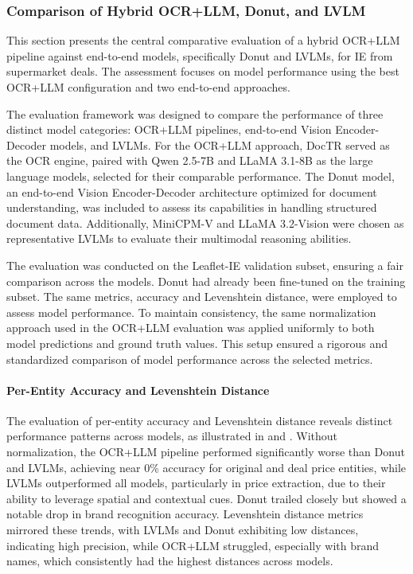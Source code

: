 \documentclass[11pt]{article}
\begin{document}
\subsubsection{Comparison of Hybrid OCR+LLM, Donut, and LVLM}

This section presents the central comparative evaluation of a hybrid OCR+LLM pipeline against end-to-end models, specifically Donut and LVLMs, for IE from supermarket deals. The assessment focuses on model performance using the best OCR+LLM configuration and two end-to-end approaches.

The evaluation framework was designed to compare the performance of three distinct model categories: OCR+LLM pipelines, end-to-end Vision Encoder-Decoder models, and LVLMs. For the OCR+LLM approach, DocTR served as the OCR engine, paired with Qwen 2.5-7B and LLaMA 3.1-8B as the large language models, selected for their comparable performance. The Donut model, an end-to-end Vision Encoder-Decoder architecture optimized for document understanding, was included to assess its capabilities in handling structured document data. Additionally, MiniCPM-V \cite{yao2024} and LLaMA 3.2-Vision \cite{touvron2023} were chosen as representative LVLMs to evaluate their multimodal reasoning abilities.

The evaluation was conducted on the Leaflet-IE validation subset, ensuring a fair comparison across the models. Donut had already been fine-tuned on the training subset. The same metrics, accuracy and Levenshtein distance, were employed to assess model performance. To maintain consistency, the same normalization approach used in the OCR+LLM evaluation was applied uniformly to both model predictions and ground truth values. This setup ensured a rigorous and standardized comparison of model performance across the selected metrics.

\paragraph{Per-Entity Accuracy and Levenshtein Distance}  
The evaluation of per-entity accuracy and Levenshtein distance reveals distinct performance patterns across models, as illustrated in  and . Without normalization, the OCR+LLM pipeline performed significantly worse than Donut and LVLMs, achieving near 0\% accuracy for original and deal price entities, while LVLMs outperformed all models, particularly in price extraction, due to their ability to leverage spatial and contextual cues. Donut trailed closely but showed a notable drop in brand recognition accuracy. Levenshtein distance metrics mirrored these trends, with LVLMs and Donut exhibiting low distances, indicating high precision, while OCR+LLM struggled, especially with brand names, which consistently had the highest distances across models.  
\end{document}
